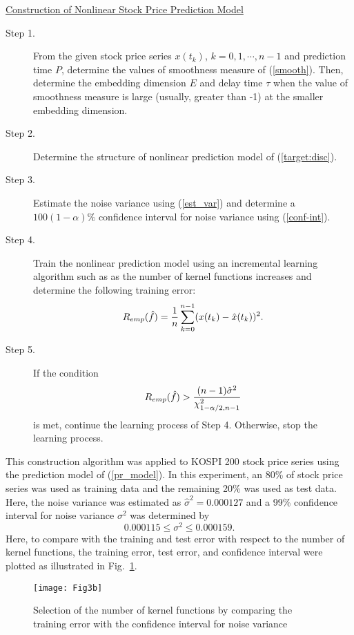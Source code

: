 \documentclass[runningheads,a4paper]{llncs}
\begin{document}
\underline{Construction of Nonlinear Stock Price Prediction Model}
\begin{description}
\item[Step 1.] From the given stock price series $x(t_k)$, $k=0, 1, \cdots, n-1$ and prediction time $P$,
                      determine the values of smoothness measure of (\ref{smooth}).
                      Then, determine the embedding dimension $E$ and delay time $\tau$ when the value of smoothness measure is large (usually, greater than -1)
                      at the smaller embedding dimension.
\item[Step 2.] Determine the structure of nonlinear prediction model of (\ref{target:disc}).
\item[Step 3.] Estimate the noise variance using (\ref{est_var}) and determine a $100(1-\alpha)\%$ confidence interval for noise variance
                      using (\ref{conf-int}).
\item[Step 4.] Train the nonlinear prediction model using an incremental learning algorithm such as \cite{Kil93} as the number of kernel functions increases
                      and determine the following training error:
\begin{equation}
R_{emp}(\hat{f})={1\over n}\sum_{k=0}^{n-1}(x(t_k)-\hat{x}(t_k))^2.
\end{equation}
\item[Step 5.] If the condition
\begin{equation}
R_{emp}(\hat{f})>{{(n-1)\hat{\sigma}^2}\over{\chi_{1-\alpha/2, n-1}^2}}
\end{equation}
                       is met, continue the learning process of Step 4. Otherwise, stop the learning process.
\end{description}
This construction algorithm was applied to KOSPI 200 stock price series using the prediction model of (\ref{pr_model}).
In this experiment, an 80\% of stock price series was used as training data and the remaining 20\% was used as test data.
Here, the noise variance was estimated as $\hat{\sigma}^2=0.000127$ and a 99\% confidence interval for noise variance $\sigma^2$ was
determined by
\[
0.000115\le \sigma^2\le 0.000159.
\]
Here, to compare with the training and test error with respect to the number of kernel functions,
the training error, test error, and confidence interval were plotted as illustrated in Fig.~\ref{fig3}.

\begin{figure}
\vspace{-1em}
\centering
\texttt{[image: Fig3b]}
\vspace{-1em}
\caption{Selection of the number of kernel functions by comparing the training error with the confidence interval for noise variance}
\label{fig3}
\end{figure}
\end{document}
